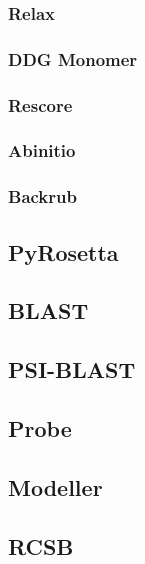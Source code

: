 \subsubsection{Relax}
\label{subsubsec:MM_Relax}

\subsubsection{DDG Monomer}
\label{subsubsec:MM_DDG_Monomer}

\subsubsection{Rescore}
\label{subsubsec:MM_Rescore}

\subsubsection{Abinitio}
\label{subsubsec:MM_Abinitio}

\subsubsection{Backrub}
\label{subsubsec:MM_Backrub}

\label{subsec:MM_Rosetta}

\subsection{PyRosetta}
\label{subsec:MM_PyRosetta}

\subsection{BLAST}
\label{subsec:MM_BLAST}

\subsection{PSI-BLAST}
\label{subsec:MM_PSI_BLAST}

\subsection{Probe}
\label{subsec:MM_Probe}

\subsection{Modeller}
\label{subsec:MM_Modeller}

\subsection{RCSB}
\label{subsec:MM_RCSB}


